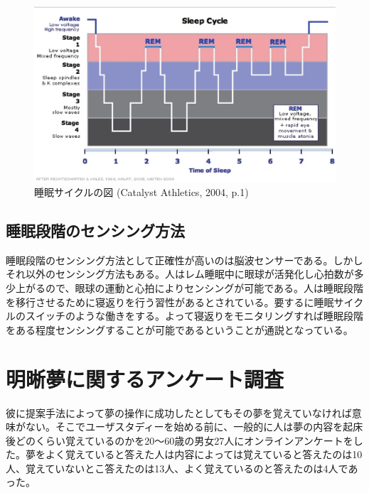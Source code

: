 \begin{figure}[htbp]
\begin{center}
\includegraphics[width=15cm]{eps/SleepHypnogram.eps}
\caption{睡眠サイクルの図 (Catalyst Athletics, 2004, p.1) }
\label{SleepHypnogram}
\end{center}
\end{figure}

\subsection{睡眠段階のセンシング方法}
睡眠段階のセンシング方法として正確性が高いのは脳波センサーである。しかしそれ以外のセンシング方法もある。人はレム睡眠中に眼球が活発化し心拍数が多少上がるので、眼球の運動と心拍によりセンシングが可能である。人は睡眠段階を移行させるために寝返りを行う習性があるとされている。要するに睡眠サイクルのスイッチのような働きをする\cite{negaeri}。よって寝返りをモニタリングすれば睡眠段階をある程度センシングすることが可能であるということが通説となっている。

\section{明晰夢に関するアンケート調査}
彼に提案手法によって夢の操作に成功したとしてもその夢を覚えていなければ意味がない。そこでユーザスタディーを始める前に、一般的に人は夢の内容を起床後どのくらい覚えているのかを20〜60歳の男女27人にオンラインアンケートをした。夢をよく覚えていると答えた人は内容によっては覚えていると答えたのは10人、覚えていないとこ答えたのは13人、よく覚えているのと答えたのは4人であった。

